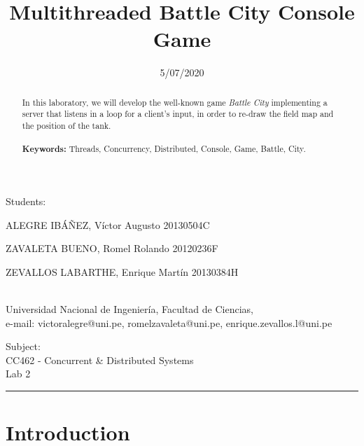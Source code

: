 \documentclass[10pt,a4paper]{article}
\theoremstyle{definition}
\begin{document}
	
\title{Multithreaded Battle City Console Game}
\date{5/07/2020}
\maketitle

\begin{center}
	Students:\\
	\vspace{5pt}
	{\large ALEGRE IBÁÑEZ, Víctor Augusto 20130504C

ZAVALETA BUENO, Romel Rolando 20120236F

ZEVALLOS LABARTHE, Enrique Martín 20130384H}\\
	Universidad Nacional de Ingenier\'ia, Facultad de Ciencias,\\
	e-mail: victoralegre@uni.pe, romelzavaleta@uni.pe, enrique.zevallos.l@uni.pe
	
\end{center}
\vspace{5pt}
\begin{center}
	Subject:\\
	\vspace{5pt}
	{\large CC462 - Concurrent \& Distributed Systems
}\\
	{\large Lab 2}\\
	

	
\end{center}
\vspace{20pt}
\begin{abstract}
{\small
\hspace*{0.5cm}
In this laboratory, we will develop the well-known game \textit{Battle City} implementing a server that listens in a loop for a client's input, in order to re-draw the field map and the position of the tank.\\\\
\textbf{Keywords:} Threads, Concurrency, Distributed, Console, Game, Battle, City.
}
\end{abstract}




\tableofcontents

\vspace{20pt}
\hrule
\vspace{10pt}

\section{Introduction}
\end{document}
